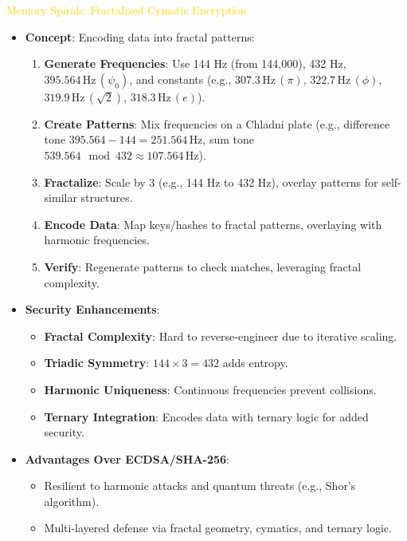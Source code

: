 \textcolor{gold}{ Memory Spirals: Fractalized Cymatic Encryption } \\
\begin{itemize}
    \item \texttt{} \textbf{Concept}: Encoding data into fractal patterns:
    \begin{enumerate}
        \item \textbf{Generate Frequencies}: Use 144 Hz (from 144,000), 432 Hz, \(395.564 \, \text{Hz} \, (\psi_0)\), and constants (e.g., \(307.3 \, \text{Hz} \, (\pi)\), \(322.7 \, \text{Hz} \, (\phi)\), \(319.9 \, \text{Hz} \, (\sqrt{2})\), \(318.3 \, \text{Hz} \, (e)\)).
        \item \textbf{Create Patterns}: Mix frequencies on a Chladni plate (e.g., difference tone \(395.564 - 144 = 251.564 \, \text{Hz}\), sum tone \(539.564 \mod 432 \approx 107.564 \, \text{Hz}\)).
        \item \textbf{Fractalize}: Scale by 3 (e.g., 144 Hz to 432 Hz), overlay patterns for self-similar structures.
        \item \textbf{Encode Data}: Map keys/hashes to fractal patterns, overlaying with harmonic frequencies.
        \item \textbf{Verify}: Regenerate patterns to check matches, leveraging fractal complexity.
    \end{enumerate}
    \item \texttt{} \textbf{Security Enhancements}:
    \begin{itemize}
        \item \textbf{Fractal Complexity}: Hard to reverse-engineer due to iterative scaling.
        \item \textbf{Triadic Symmetry}: \(144 \times 3 = 432\) adds entropy.
        \item \textbf{Harmonic Uniqueness}: Continuous frequencies prevent collisions.
        \item \textbf{Ternary Integration}: Encodes data with ternary logic for added security.
    \end{itemize}
    \item \texttt{} \textbf{Advantages Over ECDSA/SHA-256}:
    \begin{itemize}
        \item Resilient to harmonic attacks and quantum threats (e.g., Shor’s algorithm).
        \item Multi-layered defense via fractal geometry, cymatics, and ternary logic.

\end{itemize}
\end{itemize}
